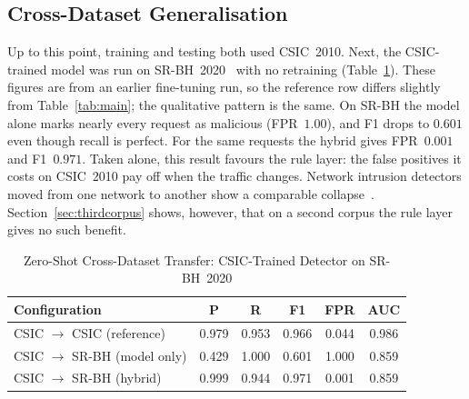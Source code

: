 \documentclass[conference]{IEEEtran}
\begin{document}
\subsection{Cross-Dataset Generalisation}
\label{sec:crossdataset}
Up to this point, training and testing both used CSIC~2010. Next, the
CSIC-trained model was run on SR-BH~2020~\cite{srbh2020} with no retraining
(Table~\ref{tab:crossdataset}). These figures are from an earlier fine-tuning run, so the reference row
differs slightly from Table~\ref{tab:main}; the qualitative pattern is the
same.
On SR-BH the model alone marks nearly every request as malicious
(FPR~$1.00$), and F1 drops to $0.601$ even though recall is perfect. For
the same requests the hybrid gives FPR~$0.001$ and F1~$0.971$. Taken alone,
this result favours the rule layer: the false positives it costs on
CSIC~2010 pay off when the traffic changes. Network intrusion detectors
moved from one network to another show a comparable
collapse~\cite{cantone2024crossdataset,venkatesan2026crossdataset}.
Section~\ref{sec:thirdcorpus} shows, however, that on a second corpus the
rule layer gives no such benefit.

\begin{table}[t]
\centering
\caption{Zero-Shot Cross-Dataset Transfer: CSIC-Trained Detector on SR-BH~2020}
\label{tab:crossdataset}
\begin{tabular}{@{}lccccc@{}}
\toprule
Configuration & P & R & F1 & FPR & AUC \\
\midrule
CSIC $\to$ CSIC (reference) & 0.979 & 0.953 & 0.966 & 0.044 & 0.986 \\
CSIC $\to$ SR-BH (model only) & 0.429 & 1.000 & 0.601 & 1.000 & 0.859 \\
CSIC $\to$ SR-BH (hybrid) & 0.999 & 0.944 & 0.971 & 0.001 & 0.859 \\
\bottomrule
\end{tabular}
\end{table}
\end{document}

